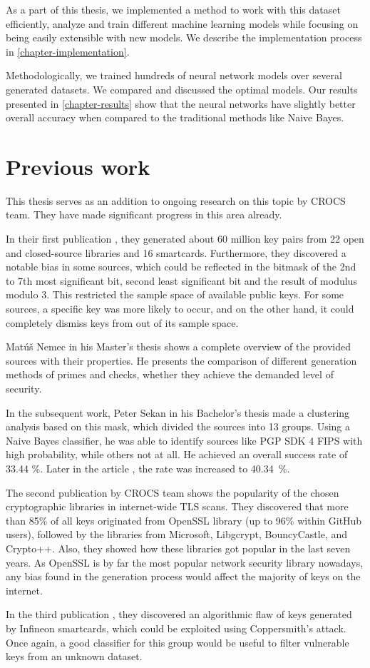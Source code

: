 As a part of this thesis, we implemented a method to work with this dataset efficiently, analyze and train different machine learning models while focusing on being easily extensible with new models. We describe the implementation process in \autoref{chapter-implementation}.

Methodologically, we trained hundreds of neural network models over several generated datasets. We compared and discussed the optimal models. Our results presented in \autoref{chapter-results} show that the neural networks have slightly better overall accuracy when compared to the traditional methods like Naive Bayes.

\section{Previous work}
\label{chapter-prev-work}

This thesis serves as an addition to ongoing research on this topic by CROCS team. They have made significant progress in this area already. 

In their first publication \cite{svenda_1}, they generated about 60 million key pairs from 22 open and closed-source libraries and 16 smartcards. Furthermore, they discovered a notable bias in some sources, which could be reflected in the bitmask of the 2nd to 7th most significant bit, second least significant bit and the result of modulus modulo 3. This restricted the sample space of available public keys. For some sources, a specific key was more likely to occur, and on the other hand, it could completely dismiss keys from out of its sample space.

Mat\'{u}š Nemec in his Master's thesis \cite{thesis_matus_nemec} shows a complete overview of the provided sources with their properties. He presents the comparison of different generation methods of primes and checks, whether they achieve the demanded level of security.

In the subsequent work, Peter Sekan in his Bachelor's thesis \cite{thesis_sekan} made a clustering analysis based on this mask, which divided the sources into 13 groups. Using a Naive Bayes classifier, he was able to identify sources like PGP SDK 4 FIPS with high probability, while others not at all. He achieved an overall success rate of 33.44 \%. Later in the article \cite{svenda_1}, the rate was increased to 40.34~\%.

The second publication by CROCS team \cite{svenda_3} shows the popularity of the chosen cryptographic libraries in internet-wide TLS scans. They discovered that more than 85\% of all keys originated from OpenSSL library (up to 96\% within GitHub users), followed by the libraries from Microsoft, Libgcrypt, BouncyCastle, and Crypto++. Also, they showed how these libraries got popular in the last seven years. As OpenSSL is by far the most popular network security library nowadays, any bias found in the generation process would affect the majority of keys on the internet.

In the third publication \cite{svenda_2}, they discovered an algorithmic flaw of keys generated by Infineon smartcards, which could be exploited using Coppersmith's attack. Once again, a good classifier for this group would be useful to filter vulnerable keys from an unknown dataset.

